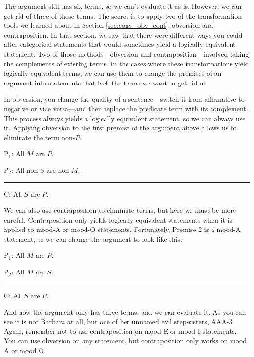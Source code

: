 The argument still has six terms, so we can't evaluate it as is. However, we can get rid of three of these terms. The secret is to apply two of the transformation tools we learned about in Section \ref{sec:conv_obv_cont}, obversion and contraposition. In that section, we saw that there were different ways you could alter categorical statements that would sometimes yield a logically equivalent statement. Two of those methods---obversion and contraposition---involved taking the complements of existing terms. In the cases where these transformations yield logically equivalent terms, we can use them to change the premises of an argument into statements that lack the terms we want to get rid of. 

In obversion, you change the quality of a sentence---switch it from affirmative to negative or vice versa---and then replace the predicate term with its complement. This process always yields a logically equivalent statement, so we can always use it. Applying obversion to the first premise of the argument above allows us to eliminate the term non-$P$.  

\begin{earg}
\item[P$_1$:]  All $M$ are $P$.
\item[P$_2$:] All non-$S$ are non-$M$.
\vspace{-.5em}
\item [] \rule{0.25\linewidth}{.5pt} 
\item[C:] All $S$ are $P$.
\end{earg} 

We can also use contraposition to eliminate terms, but here we must be more careful. Contraposition only yields logically equivalent statements when it is applied to mood-A or mood-O statements. Fortunately, Premise 2 is a mood-A statement, so we can change the argument to look like this:

\begin{earg}
\item[P$_1$:]  All $M$ are $P$.
\item[P$_2$:] All $M$ are $S$.
\vspace{-.5em}
\item [] \rule{0.2\linewidth}{.5pt} 
\item[C:] All $S$ are $P$.
\end{earg} 

And now the argument only has three terms, and we can evaluate it. As you can see it is not Barbara at all, but one of her unnamed evil step-sisters, AAA-3. Again, remember not to use contraposition on mood-E or mood-I statements. You can use obversion on any statement, but contraposition only works on mood A or mood O.  

